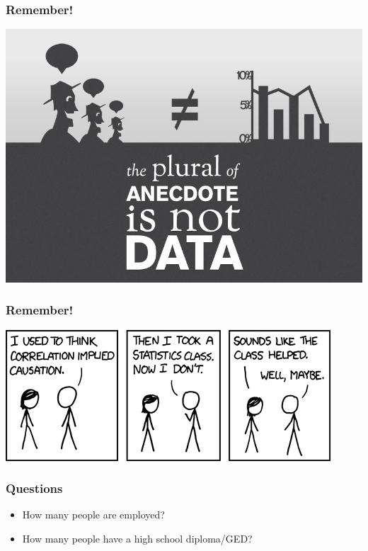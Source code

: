 \documentclass{beamer}
\begin{document}
\begin{frame}
	\frametitle{Remember!}
	\begin{center}
		\includegraphics[scale=0.35]{./images/anecdote.png}
	\end{center}
\end{frame}

\begin{frame}
	\frametitle{Remember!}
	\begin{center}
		\includegraphics[scale=0.75]{./images/xkcd_correlation.png}
	\end{center}
\end{frame}

\begin{frame}
\frametitle{Questions}
	\begin{itemize}[<+- | alert@+>]
		\item How many people are employed?
		\item How many people have a high school diploma/GED?
	\end{itemize}
\end{frame}
\end{document}
